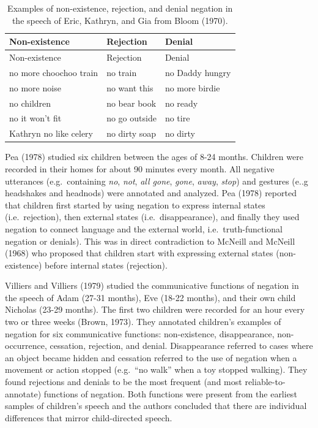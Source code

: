 \documentclass[
  english,
  man,floatsintext]{apa6}
\begin{document}
\begin{longtable}[]{@{}lll@{}}
\caption{\label{tab:bloom} Examples of non-existence, rejection, and denial negation in the speech of Eric, Kathryn, and Gia from Bloom (1970).}\tabularnewline
\toprule
Non-existence & Rejection & Denial \\
\midrule
\endfirsthead
\toprule
Non-existence & Rejection & Denial \\
\midrule
\endhead
no more choochoo train & no train & no Daddy hungry \\
no more noise & no want this & no more birdie \\
no children & no bear book & no ready \\
no it won't fit & no go outside & no tire \\
Kathryn no like celery & no dirty soap & no dirty \\
\bottomrule
\end{longtable}

Pea (1978) studied six children between the ages of 8-24 months. Children were recorded in their homes for about 90 minutes every month. All negative utterances (e.g.~containing \emph{no}, \emph{not}, \emph{all gone}, \emph{gone}, \emph{away}, \emph{stop}) and gestures (e..g headshakes and headnods) were annotated and analyzed. Pea (1978) reported that children first started by using negation to express internal states (i.e.~rejection), then external states (i.e.~disappearance), and finally they used negation to connect language and the external world, i.e.~truth-functional negation or denials). This was in direct contradiction to McNeill and McNeill (1968) who proposed that children start with expressing external states (non-existence) before internal states (rejection).

Villiers and Villiers (1979) studied the communicative functions of negation in the speech of Adam (27-31 months), Eve (18-22 months), and their own child Nicholas (23-29 months). The first two children were recorded for an hour every two or three weeks (Brown, 1973). They annotated children's examples of negation for six communicative functions: non-existence, disappearance, non-occurrence, cessation, rejection, and denial. Disappearance referred to cases where an object became hidden and cessation referred to the use of negation when a movement or action stopped (e.g.~``no walk'' when a toy stopped walking). They found rejections and denials to be the most frequent (and most reliable-to-annotate) functions of negation. Both functions were present from the earliest samples of children's speech and the authors concluded that there are individual differences that mirror child-directed speech.
\end{document}
